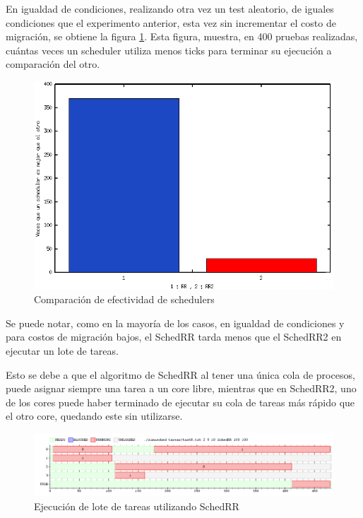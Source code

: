 \documentclass[a4paper,10pt,twoside]{article}
\begin{document}
En igualdad de condiciones, realizando otra vez un test aleatorio, de iguales condiciones que el experimento anterior, esta vez sin incrementar el costo de migración, se obtiene la figura \ref{RRvsRR2}. Esta figura, muestra, en 400 pruebas realizadas, cuántas veces un scheduler utiliza menos ticks para terminar su ejecución a comparación del otro.

\begin{figure}[ht!]
\centering
\includegraphics[width=160mm]{../ejercicio8/RRvsRR2.png}
\caption{Comparación de efectividad de schedulers}
\label{RRvsRR2}
\end{figure}

Se puede notar, como en la mayoría de los casos, en igualdad de condiciones y para costos de migración bajos, el SchedRR tarda menos que el SchedRR2 en ejecutar un lote de tareas.

Esto se debe a que el algoritmo de SchedRR al tener una única cola de procesos, puede asignar siempre una tarea a un core libre, mientras que en SchedRR2, uno de los cores puede haber terminado de ejecutar su cola de tareas más rápido que el otro core, quedando este sin utilizarse.

\begin{figure}[ht!]
\centering
\includegraphics[width=175mm]{../ejercicio8/schedRRej8.png}
\caption{Ejecución de lote de tareas utilizando SchedRR}
\label{schedRRej8}
\end{figure}
\end{document}
